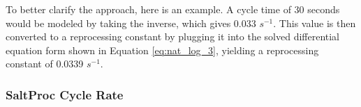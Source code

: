 


To better clarify the approach, here is an example. A cycle time of 30 seconds would be modeled by taking the inverse, which gives 0.033 $s^{-1}$.
This value is then converted to a reprocessing constant by plugging it into the solved differential equation form shown in Equation \eqref{eq:nat_log_3}, yielding a reprocessing constant of 0.0339 $s^{-1}$.





\subsubsection{SaltProc Cycle Rate}

